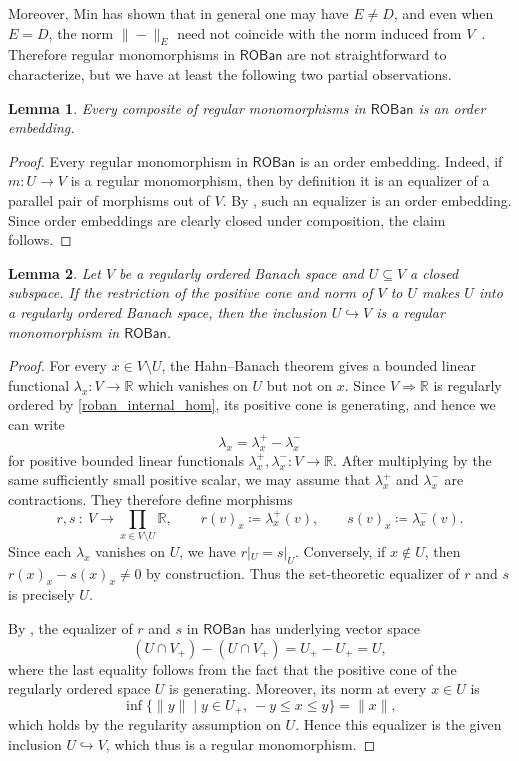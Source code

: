 \documentclass[11pt,onecolumn]{article}
\newcommand{\R}{\mathbb{R}}
\newcommand{\ROBan}{\mathsf{ROBan}}
\theoremstyle{plain}
\newtheorem{lem}[lem]{Lemma}
\theoremstyle{remark}
\theoremstyle{definition}
\begin{document}
Moreover, Min has shown that in general one may have $E \neq D$, and even when $E = D$, the norm $\|-\|_E$ need not coincide with the norm induced from $V$~\cite[Section~5.3]{MinExponentialLaw}.
Therefore regular monomorphisms in $\ROBan$ are not straightforward to characterize, but we have at least the following two partial observations.

\begin{lem}
	\label{roban_regular_embeddings}
	Every composite of regular monomorphisms in $\ROBan$ is an order embedding.
\end{lem}

\begin{proof}
	Every regular monomorphism in $\ROBan$ is an order embedding.
	Indeed, if $m \colon U \to V$ is a regular monomorphism, then by definition it is an equalizer of a parallel pair of morphisms out of $V$.
	By , such an equalizer is an order embedding.
	Since order embeddings are clearly closed under composition, the claim follows.
\end{proof}

\begin{lem}
	\label{roban_regular_embeddings2}
	Let $V$ be a regularly ordered Banach space and $U \subseteq V$ a closed subspace.
	If the restriction of the positive cone and norm of $V$ to $U$ makes $U$ into a regularly ordered Banach space,
	then the inclusion $U \hookrightarrow V$ is a regular monomorphism in $\ROBan$.
\end{lem}

\begin{proof}
	For every $x \in V \setminus U$, the Hahn--Banach theorem gives a bounded linear functional $\lambda_x \colon V \to \R$
	which vanishes on $U$ but not on $x$.
	Since $V \Rightarrow \R$ is regularly ordered by \cref{roban_internal_hom}, its positive cone is generating, and hence we can write
	\[
		\lambda_x = \lambda_x^+ - \lambda_x^-
	\]
	for positive bounded linear functionals $\lambda_x^+,\lambda_x^- \colon V \to \R$.
	After multiplying by the same sufficiently small positive scalar, we may assume that $\lambda_x^+$ and $\lambda_x^-$ are contractions.
	They therefore define morphisms
	\[
		r,s \: \colon \: V \longrightarrow \prod_{x \in V \setminus U} \R,
		\qquad
		r(v)_x \coloneqq \lambda_x^+(v),
		\qquad
		s(v)_x \coloneqq \lambda_x^-(v).
	\]
	Since each $\lambda_x$ vanishes on $U$, we have $r|_U=s|_U$.
	Conversely, if $x \notin U$, then $r(x)_x-s(x)_x\neq0$ by construction.
	Thus the set-theoretic equalizer of $r$ and $s$ is precisely $U$.

	By , the equalizer of $r$ and $s$ in $\ROBan$ has underlying vector space
	\[
		(U \cap V_+)-(U \cap V_+)=U_+-U_+=U,
	\]
	where the last equality follows from the fact that the positive cone of the regularly ordered space $U$ is generating.
	Moreover, its norm at every $x\in U$ is
	\[
		\inf\{\|y\| \mid y\in U_+,\ -y\le x\le y\}
		=
		\|x\|,
	\]
	which holds by the regularity assumption on $U$.
	Hence this equalizer is the given inclusion $U\hookrightarrow V$, which thus is a regular monomorphism.
\end{proof}
\end{document}
